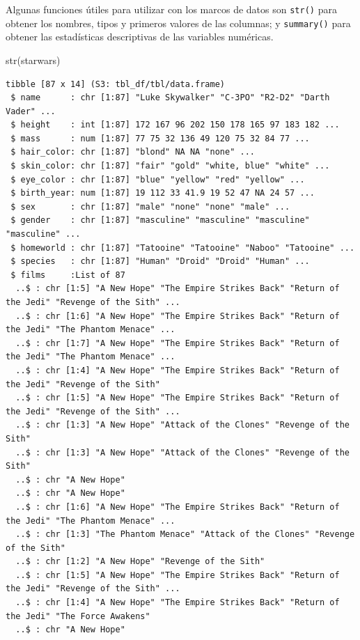 \documentclass[
  letterpaper,
  DIV=11,
  numbers=noendperiod]{scrreprt}
\newenvironment{Shaded}{\begin{snugshade}}{\end{snugshade}}
\newcommand{\FunctionTok}[1]{\textcolor[rgb]{0.28,0.35,0.67}{#1}}
\newcommand{\NormalTok}[1]{\textcolor[rgb]{0.00,0.23,0.31}{#1}}
\begin{document}
Algunas funciones útiles para utilizar con los marcos de datos son
\texttt{str()} para obtener los nombres, tipos y primeros valores de las
columnas; y \texttt{summary()} para obtener las estadísticas
descriptivas de las variables numéricas.

\begin{Shaded}
\begin{Highlighting}[]
\FunctionTok{str}\NormalTok{(starwars)}
\end{Highlighting}
\end{Shaded}

\begin{verbatim}
tibble [87 x 14] (S3: tbl_df/tbl/data.frame)
 $ name      : chr [1:87] "Luke Skywalker" "C-3PO" "R2-D2" "Darth Vader" ...
 $ height    : int [1:87] 172 167 96 202 150 178 165 97 183 182 ...
 $ mass      : num [1:87] 77 75 32 136 49 120 75 32 84 77 ...
 $ hair_color: chr [1:87] "blond" NA NA "none" ...
 $ skin_color: chr [1:87] "fair" "gold" "white, blue" "white" ...
 $ eye_color : chr [1:87] "blue" "yellow" "red" "yellow" ...
 $ birth_year: num [1:87] 19 112 33 41.9 19 52 47 NA 24 57 ...
 $ sex       : chr [1:87] "male" "none" "none" "male" ...
 $ gender    : chr [1:87] "masculine" "masculine" "masculine" "masculine" ...
 $ homeworld : chr [1:87] "Tatooine" "Tatooine" "Naboo" "Tatooine" ...
 $ species   : chr [1:87] "Human" "Droid" "Droid" "Human" ...
 $ films     :List of 87
  ..$ : chr [1:5] "A New Hope" "The Empire Strikes Back" "Return of the Jedi" "Revenge of the Sith" ...
  ..$ : chr [1:6] "A New Hope" "The Empire Strikes Back" "Return of the Jedi" "The Phantom Menace" ...
  ..$ : chr [1:7] "A New Hope" "The Empire Strikes Back" "Return of the Jedi" "The Phantom Menace" ...
  ..$ : chr [1:4] "A New Hope" "The Empire Strikes Back" "Return of the Jedi" "Revenge of the Sith"
  ..$ : chr [1:5] "A New Hope" "The Empire Strikes Back" "Return of the Jedi" "Revenge of the Sith" ...
  ..$ : chr [1:3] "A New Hope" "Attack of the Clones" "Revenge of the Sith"
  ..$ : chr [1:3] "A New Hope" "Attack of the Clones" "Revenge of the Sith"
  ..$ : chr "A New Hope"
  ..$ : chr "A New Hope"
  ..$ : chr [1:6] "A New Hope" "The Empire Strikes Back" "Return of the Jedi" "The Phantom Menace" ...
  ..$ : chr [1:3] "The Phantom Menace" "Attack of the Clones" "Revenge of the Sith"
  ..$ : chr [1:2] "A New Hope" "Revenge of the Sith"
  ..$ : chr [1:5] "A New Hope" "The Empire Strikes Back" "Return of the Jedi" "Revenge of the Sith" ...
  ..$ : chr [1:4] "A New Hope" "The Empire Strikes Back" "Return of the Jedi" "The Force Awakens"
  ..$ : chr "A New Hope"

\end{verbatim}
\end{document}
